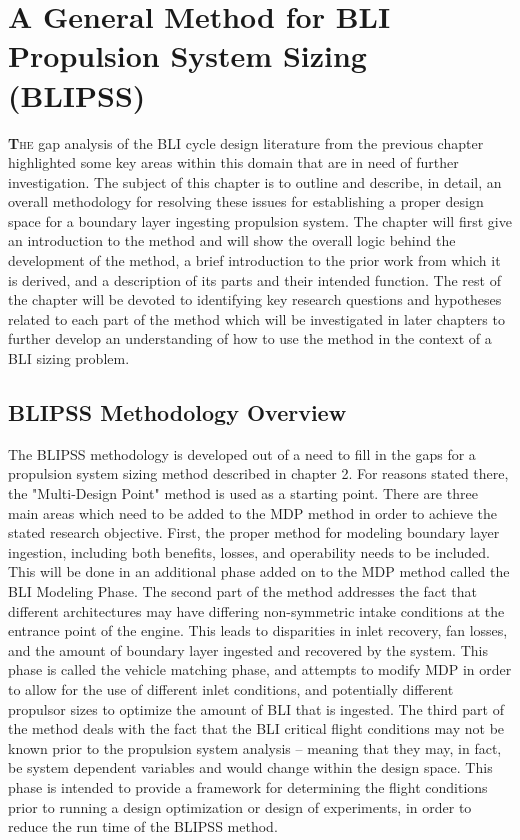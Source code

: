 \chapter{A General Method for BLI Propulsion System Sizing (BLIPSS)}
	\setcounter{secnumdepth}{2}
	\lettrine[lines = 1]{\textbf{T}}{he} gap analysis of the BLI cycle design literature from the previous chapter highlighted some key areas within this domain that are in need of further investigation.  The subject of this chapter is to outline and describe, in detail, an overall methodology for resolving these issues for establishing a proper design space for a boundary layer ingesting propulsion system.  The chapter will first give an introduction to the method and will show the overall logic behind the development of the method, a brief introduction to the prior work from which it is derived, and a description of its parts and their intended function.  The rest of the chapter will be devoted to identifying key research questions and hypotheses related to each part of the method which will be investigated in later chapters to further develop an understanding of how to use the method in the context of a BLI sizing problem.    
	\section{BLIPSS Methodology Overview}			
		The BLIPSS methodology is developed out of a need to fill in the gaps for a propulsion system sizing method described in chapter 2.  For reasons stated there, the "Multi-Design Point" method is used as a starting point.  There are three main areas which need to be added to the MDP method in order to achieve the stated research objective.  First, the proper method for modeling boundary layer ingestion, including both benefits, losses, and operability needs to be included.  This will be done in an additional phase added on to the MDP method called the BLI Modeling Phase.  The second part of the method addresses the fact that different architectures may have differing non-symmetric intake conditions at the entrance point of the engine.  This leads to disparities in inlet recovery, fan losses, and the amount of boundary layer ingested and recovered by the system.  This phase is called the vehicle matching phase, and attempts to modify MDP in order to allow for the use of different inlet conditions, and potentially different propulsor sizes to optimize the amount of BLI that is ingested.  The third part of the method deals with the fact that the BLI critical flight conditions may not be known prior to the propulsion system analysis -- meaning that they may, in fact, be system dependent variables and would change within the design space.  This phase is intended to provide a framework for determining the flight conditions prior to running a design optimization or design of experiments, in order to reduce the run time of the BLIPSS method.  
		
